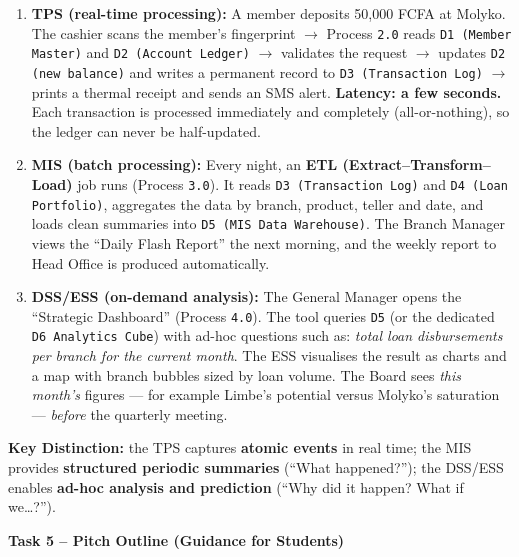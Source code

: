 \documentclass[11pt]{article}
\begin{document}
\begin{enumerate}
    \item \textbf{TPS (real-time processing):} A member deposits 50,000 FCFA at Molyko. The cashier scans the member's fingerprint $\rightarrow$ Process \texttt{2.0} reads \texttt{D1 (Member Master)} and \texttt{D2 (Account Ledger)} $\rightarrow$ validates the request $\rightarrow$ updates \texttt{D2 (new balance)} and writes a permanent record to \texttt{D3 (Transaction Log)} $\rightarrow$ prints a thermal receipt and sends an SMS alert. \textbf{Latency: a few seconds.} Each transaction is processed immediately and completely (all-or-nothing), so the ledger can never be half-updated.
    \item \textbf{MIS (batch processing):} Every night, an \textbf{ETL (Extract--Transform--Load)} job runs (Process \texttt{3.0}). It reads \texttt{D3 (Transaction Log)} and \texttt{D4 (Loan Portfolio)}, aggregates the data by branch, product, teller and date, and loads clean summaries into \texttt{D5 (MIS Data Warehouse)}. The Branch Manager views the ``Daily Flash Report'' the next morning, and the weekly report to Head Office is produced automatically.
    \item \textbf{DSS/ESS (on-demand analysis):} The General Manager opens the ``Strategic Dashboard'' (Process \texttt{4.0}). The tool queries \texttt{D5} (or the dedicated \texttt{D6 Analytics Cube}) with ad-hoc questions such as: \emph{total loan disbursements per branch for the current month}. The ESS visualises the result as charts and a map with branch bubbles sized by loan volume. The Board sees \emph{this month's} figures --- for example Limbe's potential versus Molyko's saturation --- \emph{before} the quarterly meeting.
\end{enumerate}
\textbf{Key Distinction:} the TPS captures \textbf{atomic events} in real time; the MIS provides \textbf{structured periodic summaries} (``What happened?''); the DSS/ESS enables \textbf{ad-hoc analysis and prediction} (``Why did it happen? What if we\ldots?'').

\medskip
\noindent\textbf{Task 5 -- Pitch Outline (Guidance for Students)}
\end{document}
